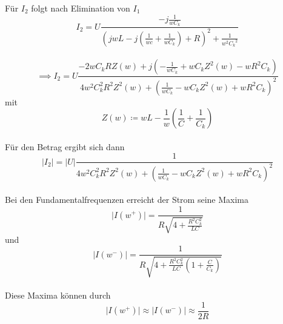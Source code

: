     Für $I_2$ folgt nach Elimination von $I_1$
\begin{equation}
    I_2 = U \frac{-j\frac{1}{wC_k}}{(jwL - j(\frac{1}{wc} + \frac{1}{wC_k})+R)^2 + \frac{1}{w^2 {C_k}^2}}
\end{equation}
\\
\begin{equation}
    \implies I_2 = U \frac{ -2wC_kRZ(w) + j(- \frac{1}{wC_k} + wC_kZ^2(w) - wR^2C_k) }{ 4w^2C_k^2R^2Z^2(w) + ( \frac{1}{wC_k} - wC_kZ^2(w) + wR^2C_k )^2 }
\end{equation} 
mit
\begin{equation}
    Z(w) \coloneq wL - \frac{1}{w} (\frac{1}{C} + \frac{1}{C_k})
\end{equation}
\\
Für den Betrag ergibt sich dann
\begin{equation}
    \lvert I_2\rvert = \lvert U\rvert \frac{1}{ 4w^2C_k^2R^2Z^2(w) + ( \frac{1}{wC_k} - wC_kZ^2(w) + wR^2C_k )^2 }
\end{equation}
\\
Bei den Fundamentalfrequenzen erreicht der Strom seine Maxima
\begin{equation}
    \lvert I(w^{+})\rvert = \frac{1}{ R\sqrt{4 + \frac{R^2C_k^2}{LC}}}
\end{equation}
und
\begin{equation}
    \lvert I(w^{-})\rvert = \frac{1}{ R\sqrt{4 + \frac{R^2C_k^2}{LC}(1+\frac{C}{C_k})}}
\end{equation}
\\
Diese Maxima können durch 
\begin{equation}
    \lvert I(w^{+})\rvert \approx \lvert I(w^{-})\rvert \approx \frac{1}{2R}
\end{equation}